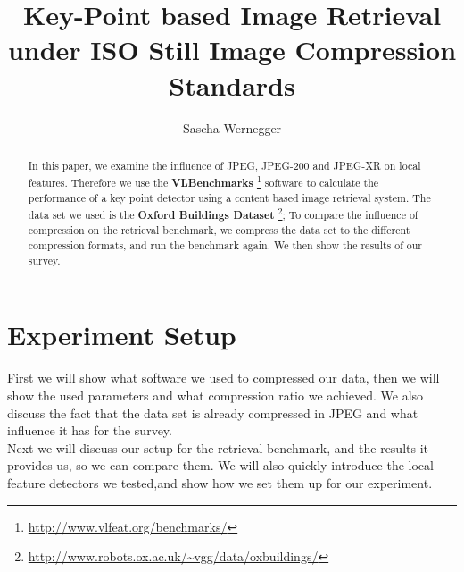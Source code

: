 \documentclass[10pt,a4paper]{article}
\author{Sascha Wernegger}
\title{Key-Point based Image Retrieval under ISO Still
Image Compression Standards}
\begin{document}
\maketitle

\begin{abstract}
In this paper, we examine the influence of JPEG, JPEG-200 and JPEG-XR on local features. Therefore we use the \textbf{VLBenchmarks} \footnote{\url{http://www.vlfeat.org/benchmarks/}} software to calculate the performance of a key point detector using a content based image retrieval system. The data set we used is the \textbf{Oxford Buildings Dataset} \footnote{\url{http://www.robots.ox.ac.uk/~vgg/data/oxbuildings/}};
To compare the influence of compression on the retrieval benchmark, we compress the data set to the different compression formats, and run the benchmark again. We then show the results of our survey.
\end{abstract}

\section{Experiment Setup}
First we will show what software we used to compressed our data, then we will show the used parameters and what compression ratio we achieved. We also discuss the fact that the data set is already compressed in JPEG and what influence it has for the survey.\\
Next we will discuss our setup for the retrieval benchmark, and the results it provides us, so we can compare them. We will also quickly introduce the local feature detectors we tested,and show how we set them up for our experiment.
\end{document}
